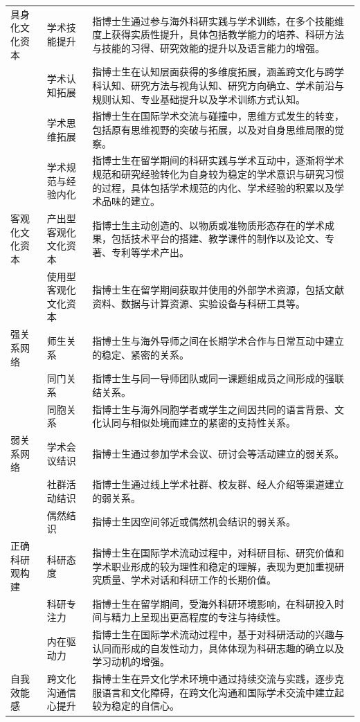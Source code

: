 {\begin{longtable}{p{2.5cm}p{3cm}p{9cm}}
具身化文化资本 & 学术技能提升 & 指博士生通过参与海外科研实践与学术训练，在多个技能维度上获得实质性提升，具体包括教学能力的培养、科研方法与技能的习得、研究效能的提升以及语言能力的增强。 \\
 & 学术认知拓展 & 指博士生在认知层面获得的多维度拓展，涵盖跨文化与跨学科认知、研究方法与视角认知、研究方向确立、学术前沿与规则认知、专业基础提升以及学术训练方式认知。 \\
 & 学术思维拓展 & 指博士生在国际学术交流与碰撞中，思维方式发生的转变，包括原有思维视野的突破与拓展，以及对自身思维局限的觉察。 \\
 & 学术规范与经验内化 & 指博士生在留学期间的科研实践与学术互动中，逐渐将学术规范和研究经验转化为自身较为稳定的学术意识与研究习惯的过程，具体包括学术规范的内化、学术经验的积累以及学术品味的建立。 \\
\midrule
客观化文化资本 & 产出型客观化文化资本 & 指博士生主动创造的、以物质或准物质形态存在的学术成果，包括技术平台的搭建、教学课件的制作以及论文、专著、专利等学术产出。 \\
 & 使用型客观化文化资本 & 指博士生在留学期间获取并使用的外部学术资源，包括文献资料、数据与计算资源、实验设备与科研工具等。 \\
\midrule
强关系网络 & 师生关系 & 指博士生与海外导师之间在长期学术合作与日常互动中建立的稳定、紧密的关系。 \\
 & 同门关系 & 指博士生与同一导师团队或同一课题组成员之间形成的强联结关系。 \\
 & 同胞关系 & 指博士生与海外同胞学者或学生之间因共同的语言背景、文化认同与相似处境而建立的紧密的支持性关系。 \\
\midrule
弱关系网络 & 学术会议结识 & 指博士生通过参加学术会议、研讨会等活动建立的弱关系。 \\
 & 社群活动结识 & 指博士生通过线上学术社群、校友群、经人介绍等渠道建立的弱关系。 \\
 & 偶然结识 & 指博士生因空间邻近或偶然机会结识的弱关系。 \\
\midrule
正确科研观构建 & 科研态度 & 指博士生在国际学术流动过程中，对科研目标、研究价值和学术职业形成的较为理性和稳定的理解，表现为更加重视研究质量、学术对话和科研工作的长期价值。 \\
 & 科研专注力 & 指博士生在留学期间，受海外科研环境影响，在科研投入时间与精力上呈现出更高程度的专注与持续性。 \\
 & 内在驱动力 & 指博士生在国际学术流动过程中，基于对科研活动的兴趣与认同而形成的自发性动力，具体体现为科研志趣的确立以及学习动机的增强。 \\
\midrule
自我效能感 & 跨文化沟通信心提升 & 指博士生在异文化学术环境中通过持续交流与实践，逐步克服语言和文化障碍，在跨文化沟通和国际学术交流中建立起较为稳定的自信心。 \\

\end{longtable}}
